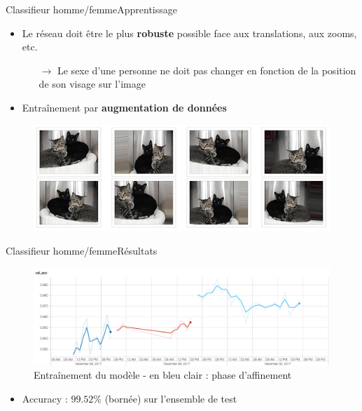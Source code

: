 \documentclass[compress]{beamer}
\begin{document}
\begin{frame}{Classifieur homme/femme}{Apprentissage}
\begin{itemize}
  \item Le réseau doit être le plus \textbf{\color{fibeamer@orange}robuste} possible face aux translations, aux zooms, etc.
  \begin{itemize}
    \item[$\rightarrow$] Le sexe d'une personne ne doit pas changer en fonction de la position de son visage sur l'image
  \end{itemize}
  \item Entraînement par \textbf{\color{fibeamer@orange}augmentation de données}
\end{itemize}
  \vspace{-0.03\linewidth}
  \begin{figure}
    \centering
    \includegraphics[width=0.8\linewidth]{resources/data-augmentation.png}
  \end{figure}
\end{frame}

\begin{frame}{Classifieur homme/femme}{Résultats}
    \begin{figure}
      \includegraphics[width=\linewidth]{resources/fine-tuning}
      \caption{Entraînement du modèle - en bleu clair : phase d'affinement}
    \end{figure}
\begin{itemize}
  \item Accuracy : $99.52 \%$ (bornée) sur l'ensemble de test
\end{itemize}
\end{frame}
\end{document}
